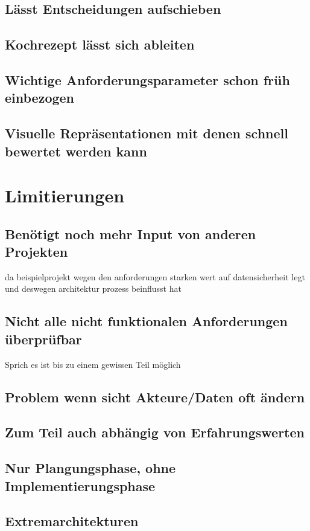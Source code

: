 \documentclass[Master,MSE,german]{twbook}
\begin{document}
\subsection{Lässt Entscheidungen aufschieben}
\subsection{Kochrezept lässt sich ableiten}
\subsection{Wichtige Anforderungsparameter schon früh einbezogen}
\subsection{Visuelle Repräsentationen mit denen schnell bewertet werden kann}

\section{Limitierungen}
\subsection{Benötigt noch mehr Input von anderen Projekten}
da beispielprojekt wegen den anforderungen starken wert auf datensicherheit legt und deswegen architektur prozess beinflusst hat

\subsection{Nicht alle nicht funktionalen Anforderungen überprüfbar}
Sprich es ist bis zu einem gewissen Teil möglich
\subsection{Problem wenn sicht Akteure/Daten oft ändern}
\subsection{Zum Teil auch abhängig von Erfahrungswerten}
\subsection{Nur Plangungsphase, ohne Implementierungsphase}
\subsection{Extremarchitekturen}
\end{document}
